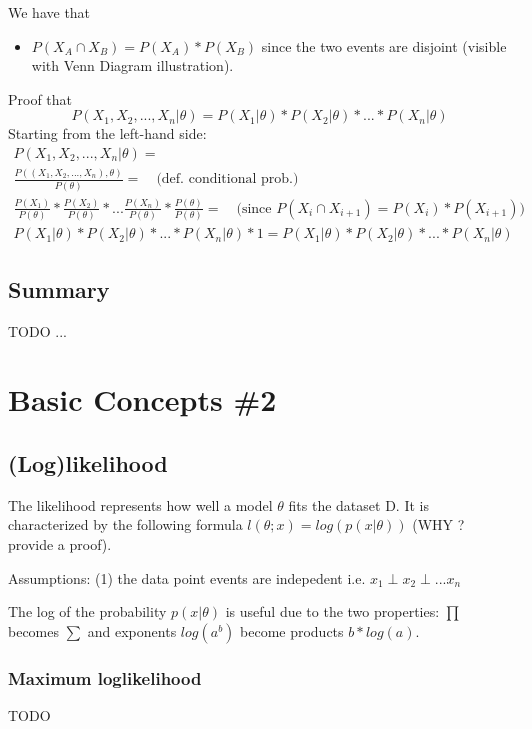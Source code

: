 \documentclass[12pt]{article}
\begin{document}
We have that
\begin{itemize}
    \item $P(X_A \cap X_{B}) = P(X_A) * P(X_{B})$ since the two events are disjoint (visible with Venn Diagram illustration).
\end{itemize}

Proof that $$P(X_1, X_2, ..., X_n | \theta) = P(X_1 | \theta) * P(X_2 | \theta) * ... * P(X_n | \theta)$$
Starting from the left-hand side:
\begin{align*}
    P(X_1, X_2, ..., X_n | \theta) = \\
    \frac{P((X_1, X_2, ..., X_n) , \theta)}{P(\theta)}  =  \quad \text{(def. conditional prob.)}  \\
    \frac{P(X_1)}{P(\theta)} * \frac{P(X_2)}{P(\theta)} * ... \frac{P(X_n)}{P(\theta)} * \frac{P(\theta)}{P(\theta)} = \quad \text{(since $P(X_i \cap X_{i+1}) = P(X_i) * P(X_{i+1})$)} \\
    P(X_1 | \theta) * P(X_2 | \theta) * ... * P(X_n | \theta) * 1 = P(X_1 | \theta) * P(X_2 | \theta) * ... * P(X_n | \theta)
\end{align*}

\subsection{Summary}
TODO ...

\section{Basic Concepts \#2}\label{basic_prob_sec2}

\subsection{(Log)likelihood}
The likelihood represents how well a model $\theta$ fits the dataset D.
It is characterized by the following formula $l(\theta; x) = log(p(x|\theta))$ (WHY ? provide a proof).

Assumptions: (1) the data point events are indepedent i.e. $x_1 \perp x_2 \perp ... x_n$ 

The log of the probability $p(x | \theta)$ is useful due to the two properties: $\prod$ becomes $\sum$ and exponents $log(a^b)$ become products $b * log(a)$.

\subsubsection{Maximum loglikelihood}
TODO
\end{document}
